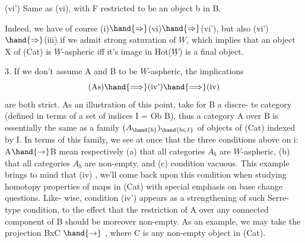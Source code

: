 
(vi') Same as (vi), with F restricted to be an object b in B.

Indeed, we have of course (i)$\hand{\Rightarrow}$(vi)$\hand{\Rightarrow}$(vi'), but also (vi')$\hand{\Rightarrow}$(iii)
if we admit strong saturation of $\underline{W}$, which implies that an object X of
(Cat) is $\underline{W}$-aspheric iff it's image in Hot($\underline{W}$) is a final object.

\hand{\uline{\textcolor{black}{Remark}}} 3. If we don't assume A and B to be $\underline{W}$-aspheric, the implications
\[ \text{(As)} \hand{\Longrightarrow} \text{(iv')} \hand{\Longrightarrow} \text{(iv)} \]
are both strict. As an illustration of this point, take for B a discre-%
te category (defined in terms of a set of indices I = Ob B), thus a
  category A over B is essentially the same as a family $(A_{\hand{b}})_{\hand{b\in I}}$
of objects of (Cat) indexed by I. In terms of this family, we see at
once that the three conditions above on i: A$\hand{\rightarrow}$B mean respectively
(a) that all categories $A_b$ are $\underline{W}$-aspheric, (b) that all categories
$A_b$ are non-empty, and (c) condition vacuous. This example brings to
mind that \hand{\uline{\textcolor{black}{condition}}} (iv) \hand{\uline{\textcolor{black}{is a Serre-fibration type condition}}} , we'll
come back upon this condition when studying  homotopy properties
of maps in (Cat)\hand{,} with special emphasis on base change questions. Like-%
wise, condition (iv') appears as a strengthening of such Serre-type
condition, to the effect that the restriction of A over any connected
component of B should be moreover non-empty. As an example, we may take
the projection BxC $\hand{\rightarrow}$  , where C is any non-empty object in (Cat).

